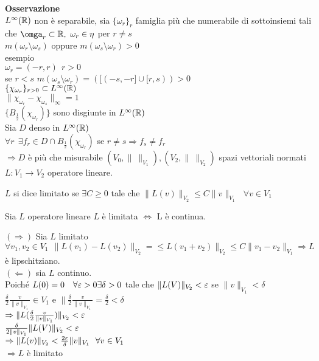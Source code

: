 \documentclass[12px]{article}
\begin{document}
	 \textbf{Osservazione}\\
	 $L^\infty(\mathbb{R})$ non è separabile, sia  $\{\omega_r\}_r$ famiglia più che numerabile di sottoinsiemi tali che  $\omga_r\subset \R, \ \omega_r\in\eta$ per  $r\neq s$\\
	  $m(\omega_r\setminus \omega_s)$ oppure  $m(\omega_s\setminus \omega_r) > 0 $ \\
	  esempio\\
	   $\omega_r = (-r, r) \ \ r > 0 $\\
	   se  $r < s$  $m(\omega_s\setminus\omega_r) = ([(-s,-r] \cup [r,s)) > 0 $ \\
	   $\{\chi_{\omega_r}\}_{r > 0 }\subset L^\infty(\mathbb{R})$\\
	   $\|\chi_{\omega_r} - \chi_{\omega_s}\|_\infty  = 1$\\
   $\{B_{\frac 12}(\chi_{\omega_r})\}$ sono disgiunte in  $L^\infty (\mathbb{R})$\\
   Sia  $D$ denso in $L^\infty(\mathbb{R})$\\
   $\forall r \ \ \exists f_r\in D\cap B_{\frac 12} (\chi_{\omega_r})$ se  $r\neq s \Rightarrow f_s \neq f_r$ \\
   $ \Rightarrow  D $ è più che misurabile
   $(V_0, \|\ \|_{V_1}), (V_2, \|\ \|_{V_2})$  spazi vettoriali normati\\
   $L: V_1 \rightarrow V_2$ operatore lineare.\\
   \begin{defi}
	   $L$ si dice limitato se $\exists C \geq 0$ tale che  $\| L(v)\|_{V_2} \leq C\|v\|_{V_1} \ \ \ \forall v\in V_1$
   \end{defi}
   \begin{teo}
   	Sia $L$ operatore lineare $L$ è limitata $ \Leftrightarrow$ L è continua.
   \end{teo}
   \begin{dimo}
	   $ ( \Rightarrow )$ Sia $L$ limitato $\forall v_1,v_2\in V_1\ \ \|L(v_1)- L(v_2)\|_{V_2} = \leq L(v_1+v_2)\|_{V_2} \leq C\|v_1 - v_2\|_{V_1} \Rightarrow  L $  è lipschitziano.\\
	   $ ( \Leftarrow )$ sia  $L$ continuo.\\ 
	   Poiché $L(0) = 0\ \ \ \forall \varepsilon > 0 \exists\delta > 0$ tale che  $\|L(V)\|_{V_2} < \varepsilon$ se $\|v\|_{V_1} < \delta$\\
   $\frac \delta 2 \frac {v}{\|v\|_{V_1}}\in V_1$ e $\|\frac \delta 2\frac {v}{\|v\|_{V_1}} = \frac \delta 2 < \delta$\\
   $ \Rightarrow  \|L(\frac\delta 2 \frac v {\|v\|_{V_1}})\|_{V_2} < \varepsilon$ \\
   $\frac \delta {2\|v\|_{V_1}}\|L(V)\|_{V_2} < \varepsilon$\\
   $ \Rightarrow  \|L(v)\|_{V_2} < \frac {2\varepsilon} \delta\|v\|_{V_1} \ \ \forall v\in V_1$\\
   $ \Rightarrow  L $ è limitato
   \end{dimo}
\end{document}

